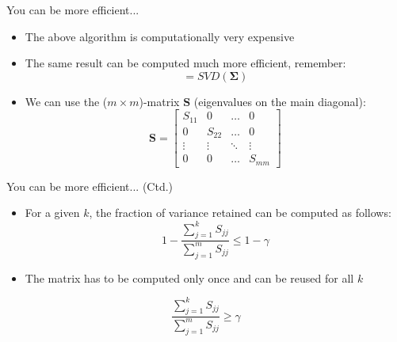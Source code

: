 \begin{frame}{You can be more efficient...}{}
	\begin{itemize}
		\item The above algorithm is computationally very expensive
		\item The same result can be computed much more efficient, remember:
		\begin{equation}
			[\bm{U}, \bm{S}, \bm{V}] = SVD(\bm{\Sigma})
		\end{equation}
		\item We can use the ($m \times m$)-matrix $\bm{S}$ (eigenvalues on the main diagonal):
		\footnotesize
		\begin{equation}
			\bm{S} =
			\begin{bmatrix}
				S_{11} 	& 0 		& \hdots 	& 0 			\\
				0 		& S_{22} 	& \hdots 	& 0 			\\
				\vdots 	& \vdots 	& \ddots 	& \vdots 		\\
				0 		& 0 		& \hdots 	& S_{mm}
			\end{bmatrix}
		\end{equation}
	\end{itemize}
\end{frame}


\begin{frame}{You can be more efficient... (Ctd.)}{}\important
	\begin{itemize}
		\item For a given $k$, the fraction of variance retained can be computed as follows:
		\begin{equation}
			1 - \frac{\sum_{j=1}^k S_{jj}}{\sum_{j=1}^m S_{jj}} \le 1 - \gamma
		\end{equation}
		\item The matrix has to be computed only once and can be reused for all $k$
	\end{itemize}
	
	\vspace*{2mm}
	\begin{boxBlueNoFrame}
		\begin{equation*}
			\frac{\sum_{j=1}^k S_{jj}}{\sum_{j=1}^m S_{jj}} \ge \gamma
		\end{equation*}
	\end{boxBlueNoFrame}
\end{frame}


